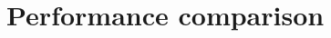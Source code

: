 \documentclass[11pt]{article}
\begin{document}
\section*{Performance comparison}


%
\end{document}
